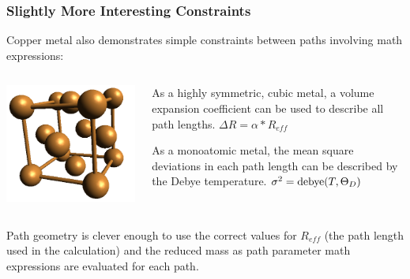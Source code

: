 \documentclass[10pt, xcolor=x11names, compress]{beamer}
\begin{document}
\begin{frame}
  \frametitle{Slightly More Interesting Constraints}

  Copper metal also demonstrates simple constraints between paths
  involving math expressions:
  \begin{columns}
    \begin{column}{0.4\linewidth}
      \includegraphics[width=\linewidth]{constraints/cu.png}      
    \end{column}
    \begin{column}{0.6\linewidth}
      \begin{description}[xyz]
      \item[$\Delta R$] As a highly symmetric, cubic metal, a volume
        expansion coefficient can be used to describe all path
        lengths. {\color{Green4}$\Delta R = \alpha*R_{eff}$}
      \item[$\sigma^2$] As a monoatomic metal, the mean square
        deviations in each path length can be described by the Debye
        temperature. {\color{Green4}$\sigma^2 = \operatorname{debye}(T, \Theta_D)$}
      \end{description}
    \end{column}
  \end{columns}
  
  \begin{block}{Path geometry}
    {\artemis} is clever enough to use the correct values for
    $R_{eff}$ (the path length used in the {\feff} calculation) and
    the reduced mass as path parameter math expressions are evaluated
    for each path.
  \end{block}
\end{frame}
\end{document}
